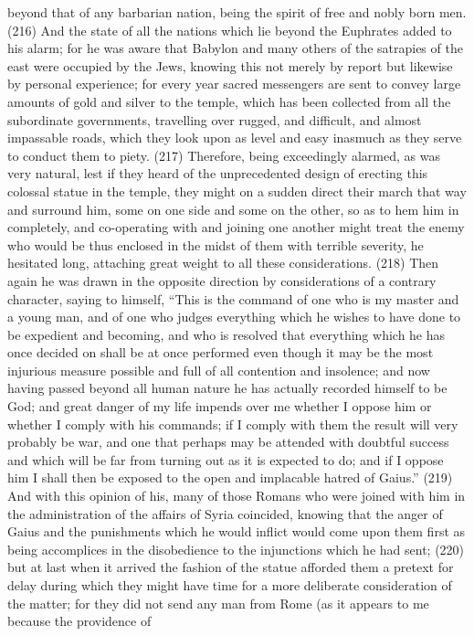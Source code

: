 beyond that of any barbarian nation, being the spirit of free and nobly born men. (216) And the
state of all the nations which lie beyond the Euphrates added to his alarm; for he was aware that
Babylon and many others of the satrapies of the east were occupied by the Jews, knowing this not
merely by report but likewise by personal experience; for every year sacred messengers are sent
to convey large amounts of gold and silver to the temple, which has been collected from all the
subordinate governments, travelling over rugged, and difficult, and almost impassable roads, which
they look upon as level and easy inasmuch as they serve to conduct them to piety. (217)
Therefore, being exceedingly alarmed, as was very natural, lest if they heard of the unprecedented
design of erecting this colossal statue in the temple, they might on a sudden direct their march that
way and surround him, some on one side and some on the other, so as to hem him in completely,
and co-operating with and joining one another might treat the enemy who would be thus enclosed in
the midst of them with terrible severity, he hesitated long, attaching great weight to all these
considerations. (218) Then again he was drawn in the opposite direction by considerations of a
contrary character, saying to himself, ``This is the command of one who is my master and a young
man, and of one who judges everything which he wishes to have done to be expedient and
becoming, and who is resolved that everything which he has once decided on shall be at once
performed even though it may be the most injurious measure possible and full of all contention and
insolence; and now having passed beyond all human nature he has actually recorded himself to be
God; and great danger of my life impends over me whether I oppose him or whether I comply with
his commands; if I comply with them the result will very probably be war, and one that perhaps may
be attended with doubtful success and which will be far from turning out as it is expected to do; and
if I oppose him I shall then be exposed to the open and implacable hatred of Gaius.'' (219) And with
this opinion of his, many of those Romans who were joined with him in the administration of the
affairs of Syria coincided, knowing that the anger of Gaius and the punishments which he would
inflict would come upon them first as being accomplices in the disobedience to the injunctions
which he had sent; (220) but at last when it arrived the fashion of the statue afforded them a
pretext for delay during which they might have time for a more deliberate consideration of the
matter; for they did not send any man from Rome (as it appears to me because the providence of
